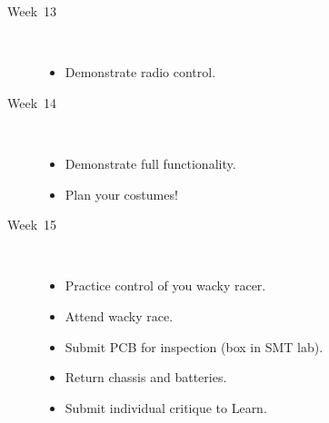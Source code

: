 \begin{description}
\item [Week~13]\mbox{}\\  
  
  \begin{itemize}
  \item Demonstrate radio control.
  \end{itemize}  
  
\item [Week~14]\mbox{}\\
  
  \begin{itemize}
  \item Demonstrate full functionality.
  \item Plan your costumes!
  \end{itemize}
  
\item [Week~15]\mbox{}\\
  
  \begin{itemize}
  \item Practice control of you wacky racer.
  \item Attend wacky race.
  \item Submit PCB for inspection (box in SMT lab).
  \item Return chassis and batteries.
  \item Submit individual critique to Learn.    
  \end{itemize}
  
\end{description}
